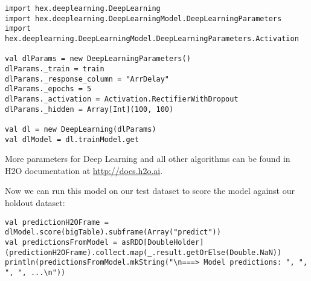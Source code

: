\begin{lstlisting}[style=Scala]
import hex.deeplearning.DeepLearning
import hex.deeplearning.DeepLearningModel.DeepLearningParameters
import hex.deeplearning.DeepLearningModel.DeepLearningParameters.Activation

val dlParams = new DeepLearningParameters()
dlParams._train = train
dlParams._response_column = "ArrDelay"
dlParams._epochs = 5
dlParams._activation = Activation.RectifierWithDropout
dlParams._hidden = Array[Int](100, 100)

val dl = new DeepLearning(dlParams)
val dlModel = dl.trainModel.get
\end{lstlisting}

More parameters for Deep Learning and all other algorithms can be found in H2O documentation at \url{http://docs.h2o.ai}.

Now we can run this model on our test dataset to score the model against our holdout dataset:
\begin{lstlisting}[style=Scala]
val predictionH2OFrame = dlModel.score(bigTable).subframe(Array("predict"))
val predictionsFromModel = asRDD[DoubleHolder](predictionH2OFrame).collect.map(_.result.getOrElse(Double.NaN))
println(predictionsFromModel.mkString("\n===> Model predictions: ", ", ", ", ...\n"))
\end{lstlisting}

